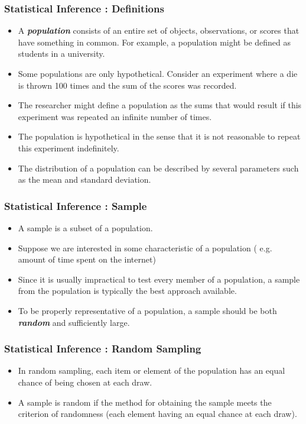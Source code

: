 \documentclass[a4]{beamer}
\begin{document}
\begin{frame}
\frametitle{Statistical Inference : Definitions}
\begin{itemize}
\item A \textbf{\emph{population}} consists of an entire set of objects, observations, or scores that have something in common.
For example, a population might be defined as students in a university.

\item Some populations are only hypothetical. Consider an experiment where a die is thrown 100 times and the sum of the scores was recorded.
\item The researcher might define a population as the sums that would result if this experiment was repeated an infinite number of times.
\item The population is hypothetical in the sense that it is not reasonable to repeat this experiment indefinitely.
\item The distribution of a population can be described by several parameters such as the mean and standard deviation.

\end{itemize}
\end{frame}
\begin{frame}
\frametitle{Statistical Inference : Sample}
\begin{itemize}

\item A sample is a subset of a population.
\item Suppose we are interested in some characteristic of a population ( e.g. amount of time spent on the internet)
\item Since it is usually impractical to test every member of a population, a sample from the population is typically
the best approach available.
\item To be properly representative of a population, a sample should be both \textbf{\emph{ random}} and sufficiently large.


\end{itemize}
\end{frame}



\begin{frame}
\frametitle{Statistical Inference : Random Sampling}
\begin{itemize}

\item In random sampling, each item or element of the population has an equal chance of being chosen at each draw.
\item A sample is random if the method for obtaining the sample meets the criterion of randomness
(each element having an equal chance at each draw).


\end{itemize}
\end{frame}
\end{document}
